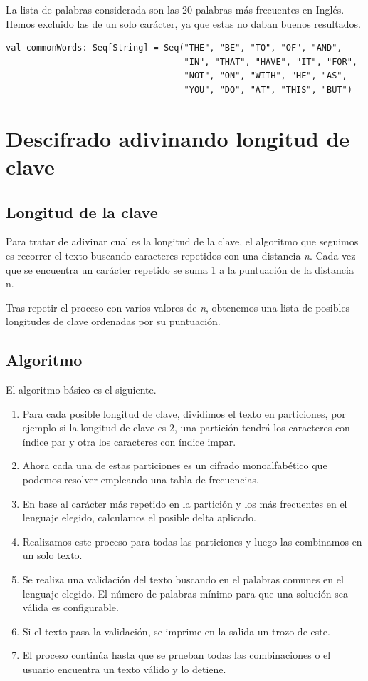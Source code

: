\documentclass[12pt]{report}
\begin{document}
La lista de palabras considerada son las 20 palabras más frecuentes en Inglés. Hemos excluido las de un solo carácter, ya que estas no daban buenos resultados.

\begin{verbatim}
val commonWords: Seq[String] = Seq("THE", "BE", "TO", "OF", "AND", 
                                   "IN", "THAT", "HAVE", "IT", "FOR",
                                   "NOT", "ON", "WITH", "HE", "AS",
                                   "YOU", "DO", "AT", "THIS", "BUT")
\end{verbatim}
\section{Descifrado adivinando longitud de clave}
\subsection{Longitud de la clave}
Para tratar de adivinar cual es la longitud de la clave, el algoritmo que seguimos es recorrer 
el texto buscando caracteres repetidos con una distancia \textit{n}. Cada vez que se encuentra un 
carácter repetido se suma 1 a la puntuación de la distancia n.

Tras repetir el proceso con varios valores de \textit{n}, obtenemos una lista de posibles longitudes
de clave ordenadas por su puntuación.

\subsection{Algoritmo}
El algoritmo básico es el siguiente.
\begin{enumerate}
\item Para cada posible longitud de clave, dividimos el texto en particiones, por ejemplo si la 
longitud de clave es 2, una partición tendrá los caracteres con índice par y otra los caracteres con 
índice impar.
\item Ahora cada una de estas particiones es un cifrado monoalfabético que podemos resolver empleando 
una tabla de frecuencias.
\item En base al carácter más repetido en la partición y los más frecuentes en el lenguaje elegido, 
calculamos el posible delta aplicado.
\item Realizamos este proceso para todas las particiones y luego las combinamos en un solo texto.
\item Se realiza una validación del texto buscando en el palabras comunes en el lenguaje elegido. El 
número de palabras mínimo para que una solución sea válida es configurable.
\item Si el texto pasa la validación, se imprime en la salida un trozo de este.
\item El proceso continúa hasta que se prueban todas las combinaciones o el usuario encuentra un texto 
válido y lo detiene.
\end{enumerate}
 
\end{document}
